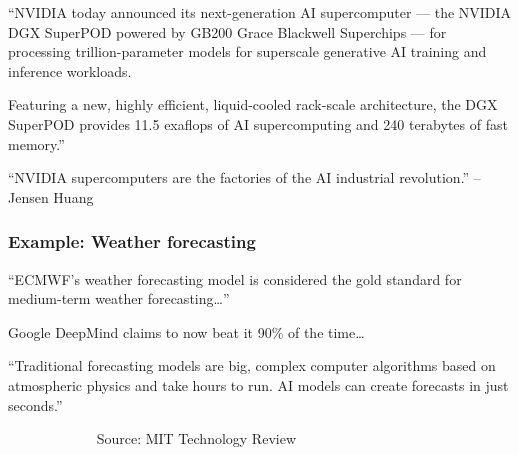 \documentclass[
    xcolor={svgnames,dvipsnames},
    hyperref={colorlinks, citecolor=DeepPink4, linkcolor=DarkRed, urlcolor=DarkBlue}
    ]{beamer}  %
\newcommand{\1}{\mathbbm 1}
\begin{document}
\begin{frame} 
    
    ``NVIDIA today announced its next-generation AI supercomputer — the NVIDIA
    DGX SuperPOD powered by GB200 Grace Blackwell Superchips — for
    processing trillion-parameter models for superscale
    generative AI training and inference workloads.
    \vspace{0.5em}
    \vspace{0.5em}

    Featuring a new, highly efficient, liquid-cooled rack-scale architecture,
    the DGX SuperPOD provides
    11.5 exaflops of AI supercomputing and 240 terabytes of fast memory.''

    \vspace{0.5em}
    \vspace{0.5em}
    ``NVIDIA supercomputers are the factories of the AI industrial
    revolution.'' -- Jensen Huang

\end{frame}



\begin{frame}
    \frametitle{Example: Weather forecasting}

    
    ``ECMWF's weather forecasting model is considered the gold standard for
        medium-term weather forecasting\ldots ''

        \pause

    \vspace{0.5em}
    Google DeepMind claims to now beat it 90\% of the time\ldots
    \vspace{0.5em}

    ``Traditional forecasting models are big, complex computer algorithms based
    on atmospheric physics and take hours to run. AI models can create forecasts
    in just seconds.'' 
    \vspace{0.5em}
    \vspace{0.5em}

    $\quad \qquad$$\quad \qquad$ Source: MIT Technology Review  

\end{frame}
\end{document}
